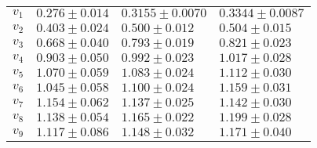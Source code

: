 \begin{table}
\begin{tabular}{llll}
    \midrule
    $v_{1}$ & $0.276\pm0.014$ & $0.3155\pm0.0070$ & $0.3344\pm0.0087$\\
    $v_{2}$ & $0.403\pm0.024$ & $0.500\pm0.012$ & $0.504\pm0.015$\\
    $v_{3}$ & $0.668\pm0.040$ & $0.793\pm0.019$ & $0.821\pm0.023$\\
    $v_{4}$ & $0.903\pm0.050$ & $0.992\pm0.023$ & $1.017\pm0.028$\\
    $v_{5}$ & $1.070\pm0.059$ & $1.083\pm0.024$ & $1.112\pm0.030$\\
    $v_{6}$ & $1.045\pm0.058$ & $1.100\pm0.024$ & $1.159\pm0.031$\\
    $v_{7}$ & $1.154\pm0.062$ & $1.137\pm0.025$ & $1.142\pm0.030$\\
    $v_{8}$ & $1.138\pm0.054$ & $1.165\pm0.022$ & $1.199\pm0.028$\\
    $v_{9}$ & $1.117\pm0.086$ & $1.148\pm0.032$ & $1.171\pm0.040$\\
    \bottomrule
  \end{tabular}
\end{table}

